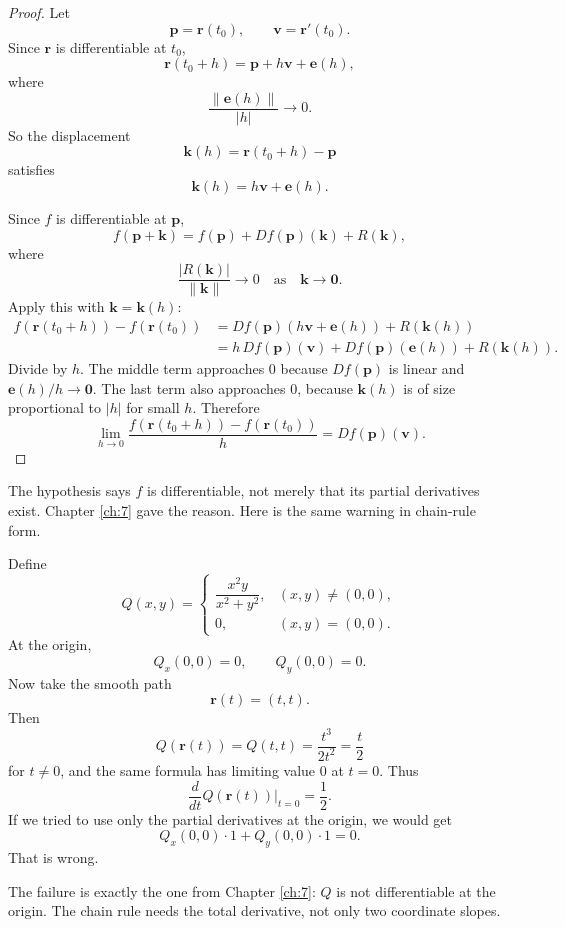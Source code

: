 \begin{proof}
Let
\[
    \mathbf p=\mathbf r(t_0),
    \qquad
    \mathbf v=\mathbf r'(t_0).
\]
Since \(\mathbf r\) is differentiable at \(t_0\),
\[
    \mathbf r(t_0+h)=\mathbf p+h\mathbf v+\mathbf e(h),
\]
where
\[
    \frac{\|\mathbf e(h)\|}{|h|}\to0.
\]
So the displacement
\[
    \mathbf k(h)=\mathbf r(t_0+h)-\mathbf p
\]
satisfies
\[
    \mathbf k(h)=h\mathbf v+\mathbf e(h).
\]

Since \(f\) is differentiable at \(\mathbf p\),
\[
    f(\mathbf p+\mathbf k)
    =
    f(\mathbf p)+Df(\mathbf p)(\mathbf k)+R(\mathbf k),
\]
where
\[
    \frac{|R(\mathbf k)|}{\|\mathbf k\|}\to0
    \quad\text{as}\quad
    \mathbf k\to\mathbf 0.
\]
Apply this with \(\mathbf k=\mathbf k(h)\):
\[
\begin{aligned}
f(\mathbf r(t_0+h))-f(\mathbf r(t_0))
&=
Df(\mathbf p)(h\mathbf v+\mathbf e(h))+R(\mathbf k(h))\\
&=
h\,Df(\mathbf p)(\mathbf v)
+
Df(\mathbf p)(\mathbf e(h))
+
R(\mathbf k(h)).
\end{aligned}
\]
Divide by \(h\).  The middle term approaches \(0\) because \(Df(\mathbf p)\) is
linear and \(\mathbf e(h)/h\to\mathbf 0\).  The last term also approaches \(0\), because
\(\mathbf k(h)\) is of size proportional to \(|h|\) for small \(h\).  Therefore
\[
    \lim_{h\to0}
    \frac{f(\mathbf r(t_0+h))-f(\mathbf r(t_0))}{h}
    =
    Df(\mathbf p)(\mathbf v).
\]
\end{proof}

The hypothesis says \(f\) is differentiable, not merely that its partial derivatives
exist.  Chapter \ref{ch:7} gave the reason.  Here is the same warning in chain-rule
form.

\begin{example}
Define
\[
    Q(x,y)=
    \begin{cases}
    \dfrac{x^2y}{x^2+y^2}, & (x,y)\ne(0,0),\\[2mm]
    0, & (x,y)=(0,0).
    \end{cases}
\]
At the origin,
\[
    Q_x(0,0)=0,
    \qquad
    Q_y(0,0)=0.
\]
Now take the smooth path
\[
    \mathbf r(t)=(t,t).
\]
Then
\[
    Q(\mathbf r(t))
    =
    Q(t,t)
    =
    \frac{t^3}{2t^2}
    =
    \frac{t}{2}
\]
for \(t\ne0\), and the same formula has limiting value \(0\) at \(t=0\).  Thus
\[
    \frac{d}{dt}Q(\mathbf r(t))\bigg|_{t=0}
    =
    \frac12.
\]
If we tried to use only the partial derivatives at the origin, we would get
\[
    Q_x(0,0)\cdot 1+Q_y(0,0)\cdot 1=0.
\]
That is wrong.

The failure is exactly the one from Chapter \ref{ch:7}: \(Q\) is not differentiable at
the origin.  The chain rule needs the total derivative, not only two coordinate slopes.
\end{example}

